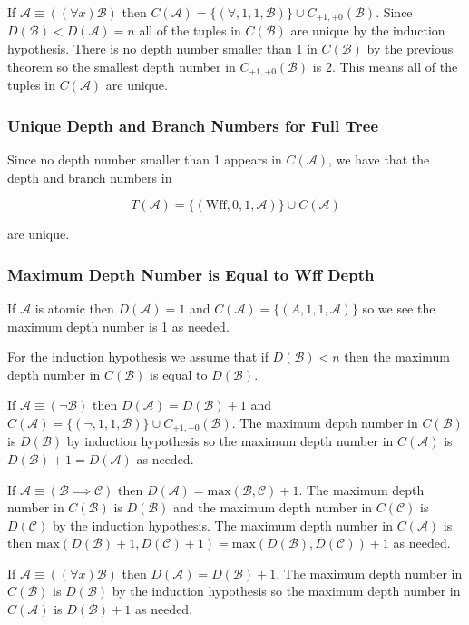 \documentclass[12pt]{article}
\theoremstyle{break}
\theoremstyle{break}
\theoremstyle{break}
\theoremstyle{break}
\newcommand{\mc}[1]{\mathcal{#1}}
\begin{document}
If $\mc{A} \equiv ((\forall x)\mc{B})$ then $C(\mc{A}) = \{(\forall, 1, 1, \mc{B})\} \cup C_{+1, +0}(\mc{B})$. Since $D(\mc{B}) < D(\mc{A}) = n$ all of the tuples in $C(\mc{B})$ are unique by the induction hypothesis. There is no depth number smaller than 1 in $C(\mc{B})$ by the previous theorem so the smallest depth number in $C_{+1, +0}(\mc{B})$ is 2. This means all of the tuples in $C(\mc{A})$ are unique.

\subsubsection{Unique Depth and Branch Numbers for Full Tree}

Since no depth number smaller than 1 appears in $C(\mc{A})$, we have that the depth and branch numbers in 

$$
T(\mc{A}) = \{(\text{Wff}, 0, 1, \mc{A})\} \cup C(\mc{A})
$$

are unique.


\subsubsection{Maximum Depth Number is Equal to Wff Depth}

If $\mc{A}$ is atomic then $D(\mc{A}) = 1$ and $C(\mc{A}) = \{(A, 1, 1, \mc{A})\}$ so we see the maximum depth number is 1 as needed.

For the induction hypothesis we assume that if $D(\mc{B}) < n$ then the maximum depth number in $C(\mc{B})$ is equal to $D(\mc{B})$.

If $\mc{A} \equiv (\lnot \mc{B})$ then $D(\mc{A}) = D(\mc{B}) + 1$ and $C(\mc{A}) = \{(\lnot, 1, 1, \mc{B})\} \cup C_{+1, +0}(\mc{B})$. The maximum depth number in $C(\mc{B})$ is $D(\mc{B})$ by induction hypothesis so the maximum depth number in $C(\mc{A})$ is $D(\mc{B}) + 1 = D(\mc{A})$ as needed.

If $\mc{A} \equiv (\mc{B} \implies \mc{C})$ then $D(\mc{A}) = \text{max}(\mc{B}, \mc{C}) + 1$. The maximum depth number in $C(\mc{B})$ is $D(\mc{B})$ and the maximum depth number in $C(\mc{C})$ is $D(\mc{C})$ by the induction hypothesis. The maximum depth number in $C(\mc{A})$ is then $\text{max}(D(\mc{B}) + 1, D(\mc{C})+1) = \text{max}(D(\mc{B}), D(\mc{C})) + 1$ as needed.

If $\mc{A} \equiv ((\forall x)\mc{B})$ then $D(\mc{A}) = D(\mc{B}) + 1$. The maximum depth number in $C(\mc{B})$ is $D(\mc{B})$ by the induction hypothesis so the maximum depth number in $C(\mc{A})$ is $D(\mc{B}) + 1$ as needed.
\end{document}
